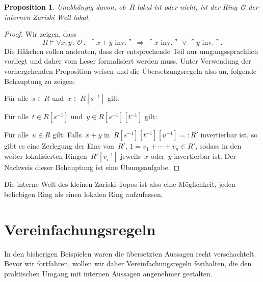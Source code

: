 \documentclass[a4paper,ngerman,12pt]{scrartcl}
\theoremstyle{definition}
\theoremstyle{plain}
\newtheorem{prop}[defn]{Proposition}
\theoremstyle{remark}
\renewcommand{\O}{\mathcal{O}}
\renewcommand{\_}{\mathpunct{.}\,}
\newcommand{\?}{\,{:}\,}
\newcommand{\speak}[1]{\ulcorner\text{#1}\urcorner}
\newenvironment{indentblock}{%
  \list{}{\leftmargin\leftmargin}%
  \item\relax
}{%
  \endlist
}
\begin{document}
\begin{prop}\label{intern-lokal}%
Unabhängig davon, ob~$R$ lokal ist oder nicht, ist der Ring~$\O$
der internen Zariski-Welt lokal.\end{prop}
\begin{proof}
Wir zeigen, dass
\[ R \models \forall x,y\?\O\_\ \speak{$x+y$ inv.}\ \Longrightarrow\ 
  \speak{$x$ inv.} \,\vee\, \speak{$y$ inv.}. \]
Die Häkchen sollen andeuten, dass der entsprechende Teil nur umgangssprachlich
vorliegt und daher vom Leser formalisiert werden muss. Unter Verwendung der
vorhergehenden Proposition weisen und die
Übersetzungsregeln also an, folgende Behauptung zu zeigen:
\begin{indentblock}
Für alle~$s \in R$ und~$x \in R[s^{-1}]$ gilt:
\begin{indentblock}
Für alle~$t \in R[s^{-1}]$ und~$y \in R[s^{-1}][t^{-1}]$ gilt:
\begin{indentblock}
Für alle~$u \in R$ gilt: Falls~$x+y$ in~$R[s^{-1}][t^{-1}][u^{-1}] =: R'$
invertierbar ist, so gibt es eine Zerlegung der Eins von~$R'$, $1 = v_1 +
\cdots + v_n \in R'$, sodass in den
weiter lokalisierten Ringen~$R'[v_i^{-1}]$ jeweils~$x$ oder~$y$ invertierbar
ist.
\end{indentblock}
\end{indentblock}
\end{indentblock}
Der Nachweis dieser Behauptung ist eine Übungsaufgabe.
\end{proof}

Die interne Welt des kleinen Zariski-Topos ist also eine Möglichkeit, jeden
beliebigen Ring als einen lokalen Ring aufzufassen.


\section{Vereinfachungsregeln}

In den bisherigen Beispielen waren die übersetzten Aussagen recht
verschachtelt. Bevor wir fortfahren, wollen wir daher
Vereinfachungsregeln festhalten, die den praktischen Umgang mit internen
Aussagen angenehmer gestalten.
\end{document}
